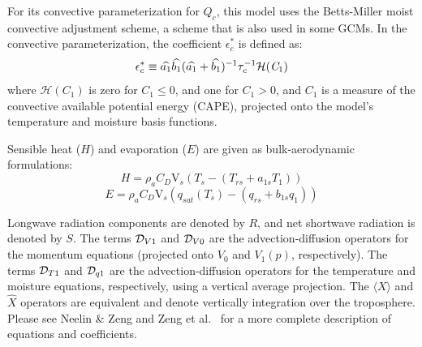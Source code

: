 For its convective parameterization for $Q_c$, this model uses the
Betts-Miller \cite{Betts/Miller:1986} moist convective
adjustment scheme, a scheme that is also used in some GCMs.
In the convective parameterization, the coefficient
$\epsilon^\ast_c$ is defined as:
\begin{equation}
   \epsilon^\ast_c 
      \equiv 
   \widehat{a_1} \widehat{b_1} (\widehat{a_1} + \widehat{b_1})^{-1} \tau_c^{-1} 
      \mathcal{H}( \mathit{C}_{\mathrm{1}} )
\end{equation}
where $\mathcal{H}( \mathit{C}_{\mathrm{1}} )$ is zero for
$C_{1} \leq 0$, and one for $C_{1} > 0$, and $C_{1}$
is a measure of the convective available potential energy (CAPE),
projected onto the model's temperature and moisture basis functions.

Sensible heat ($H$) and evaporation ($E$) are given as
bulk-aerodynamic formulations:
\begin{equation}
   H
      =
   \rho_a C_D \mathrm{V}_s (T_s - (T_{rs} + a_{1s} T_1))
\end{equation}
\begin{equation}
   E
      =
   \rho_a C_D \mathrm{V}_s (q_\mathit{sat} (T_s) 
      - (q_{rs} + b_{1s} q_1))
\end{equation}

Longwave radiation components are denoted by $R$, and net shortwave
radiation is denoted by $S$.
The terms $\mathcal{D}_{V1}$ and $\mathcal{D}_{V0}$ are the advection-diffusion operators
for the momentum equations (projected onto $V_0$ and $V_1 (p)$,
respectively).
The terms $\mathcal{D}_{T1}$ and $\mathcal{D}_{q1}$ are the
advection-diffusion operators for the temperature and moisture
equations, respectively, using a vertical average projection.
The $\langle X \rangle$ and $\widehat{X}$ operators are
equivalent and denote vertically integration over the troposphere.
Please see Neelin \& Zeng \cite{Neelin/Zeng:2000} and 
Zeng et al.\ \cite{Zeng/etal:2000}
for a more complete description of equations and coefficients.







